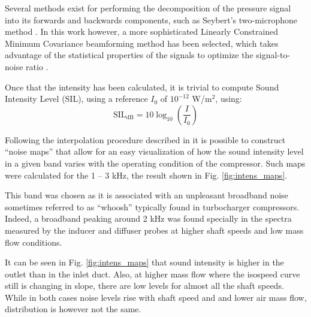 Several methods exist for performing the decomposition of the pressure signal into its forwards and backwards components, such as Seybert's two-microphone method \cite{seybert1988two}. In this work however, a more sophisticated Linearly Constrained Minimum Covariance beamforming method \cite{frost1972algorithm} has been selected, which takes advantage of the statistical properties of the signals to optimize the signal-to-noise ratio \cite{van1988beamforming,pinero2000estimation}.

Once that the intensity has been calculated, it is trivial to compute Sound Intensity Level (SIL), using a reference $I_0$ of $10^{-12}$ W/m${}^2$, using:
\begin{equation}
  \text{SIL}_\text{dB} = 10 \log_{10} \left(\frac{I}{I_0}\right)
\end{equation}

Following the interpolation procedure described in \cite{torregrosa2016experimental} it is possible to construct ``noise maps'' that allow for an easy visualization of how the sound intensity level in a given band varies with the operating condition of the compressor. Such maps were calculated for the 1 -- 3 kHz, the result shown in Fig. \ref{fig:intens_maps}. 

This band was chosen as it is associated with an unpleasant broadband noise sometimes referred to as ``whoosh'' \cite{evans2005minimizing,trochon2001new} typically found in turbocharger compressors. Indeed, a broadband peaking around 2 kHz was found specially in the spectra measured by the inducer and diffuser probes at higher shaft speeds and low mass flow conditions. 


It can be seen in Fig. \ref{fig:intens_maps} that sound intensity is higher in the outlet than in the inlet duct. Also, at higher mass flow where the isospeed curve still is changing in slope, there are low levels for almost all the shaft speeds. While in both cases noise levels rise with shaft speed and and lower air mass flow, distribution is however not the same. 

